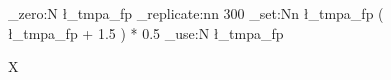 \documentclass{article}
\begin{document}
\begin{figure}
\ExplSyntaxOn
\fp_zero:N \l_tmpa_fp
\prg_replicate:nn { 300 } { \fp_set:Nn \l_tmpa_fp { ( \l_tmpa_fp + 1.5 ) * 0.5 } }
\fp_use:N \l_tmpa_fp
\ExplSyntaxOff
\caption{X}
\end{figure}
\gdef\SatexReachedEnd{}
\end{document}
